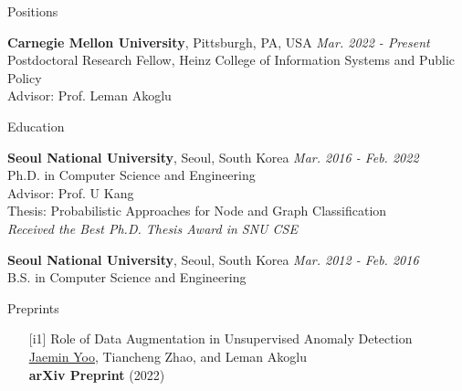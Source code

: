 \documentclass{resume} %
\begin{document}

\begin{rSection}{Positions}

\textbf{Carnegie Mellon University}, Pittsburgh, PA, USA \hfill \emph{Mar. 2022 - Present} \\ 
Postdoctoral Research Fellow, Heinz College of Information Systems and Public Policy \\
Advisor: Prof. Leman Akoglu

\end{rSection}


\begin{rSection}{Education}

\textbf{Seoul National University}, Seoul, South Korea \hfill \emph{Mar. 2016 - Feb. 2022} \\ 
Ph.D. in Computer Science and Engineering \\
Advisor: Prof. U Kang \\
Thesis: Probabilistic Approaches for Node and Graph Classification \\
\emph{Received the Best Ph.D. Thesis Award in SNU CSE}

\textbf{Seoul National University}, Seoul, South Korea \hfill \emph{Mar. 2012 - Feb. 2016} \\ 
B.S. in Computer Science and Engineering

\end{rSection}


\begin{rSection}{Preprints}
\smallskip
\begin{enumerate}

	\item[{[i1]}]
		Role of Data Augmentation in Unsupervised Anomaly Detection \\
		\underline{Jaemin Yoo}, Tiancheng Zhao, and Leman Akoglu \\
		\textbf{arXiv Preprint} (2022) \\

\end{enumerate}
\end{rSection}
\end{document}
